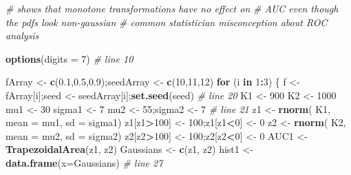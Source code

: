\documentclass[
]{book}
\newenvironment{Shaded}{\begin{snugshade}}{\end{snugshade}}
\newcommand{\CommentTok}[1]{\textcolor[rgb]{0.56,0.35,0.01}{\textit{#1}}}
\newcommand{\ControlFlowTok}[1]{\textcolor[rgb]{0.13,0.29,0.53}{\textbf{#1}}}
\newcommand{\DataTypeTok}[1]{\textcolor[rgb]{0.13,0.29,0.53}{#1}}
\newcommand{\DecValTok}[1]{\textcolor[rgb]{0.00,0.00,0.81}{#1}}
\newcommand{\FloatTok}[1]{\textcolor[rgb]{0.00,0.00,0.81}{#1}}
\newcommand{\KeywordTok}[1]{\textcolor[rgb]{0.13,0.29,0.53}{\textbf{#1}}}
\newcommand{\NormalTok}[1]{#1}
\newcommand{\OperatorTok}[1]{\textcolor[rgb]{0.81,0.36,0.00}{\textbf{#1}}}
\newcommand{\StringTok}[1]{\textcolor[rgb]{0.31,0.60,0.02}{#1}}
\begin{document}
\begin{Shaded}
\begin{Highlighting}[]
\CommentTok{\# shows that monotone transformations have no effect on }
\CommentTok{\# AUC even though the pdfs look non{-}gaussian}
\CommentTok{\# common statistician misconception about ROC analysis}

\KeywordTok{options}\NormalTok{(}\DataTypeTok{digits =} \DecValTok{7}\NormalTok{) }\CommentTok{\# line 10}

\NormalTok{fArray \textless{}{-}}\StringTok{ }\KeywordTok{c}\NormalTok{(}\FloatTok{0.1}\NormalTok{,}\FloatTok{0.5}\NormalTok{,}\FloatTok{0.9}\NormalTok{);seedArray \textless{}{-}}\StringTok{ }\KeywordTok{c}\NormalTok{(}\DecValTok{10}\NormalTok{,}\DecValTok{11}\NormalTok{,}\DecValTok{12}\NormalTok{)}
\ControlFlowTok{for}\NormalTok{ (i }\ControlFlowTok{in} \DecValTok{1}\OperatorTok{:}\DecValTok{3}\NormalTok{) \{ }
\NormalTok{  f \textless{}{-}}\StringTok{ }\NormalTok{fArray[i];seed \textless{}{-}}\StringTok{ }\NormalTok{seedArray[i];}\KeywordTok{set.seed}\NormalTok{(seed) }\CommentTok{\# line 20}
\NormalTok{  K1 \textless{}{-}}\StringTok{ }\DecValTok{900}
\NormalTok{  K2 \textless{}{-}}\StringTok{ }\DecValTok{1000}
\NormalTok{  mu1 \textless{}{-}}\StringTok{ }\DecValTok{30}
\NormalTok{  sigma1 \textless{}{-}}\StringTok{ }\DecValTok{7}
\NormalTok{  mu2 \textless{}{-}}\StringTok{ }\DecValTok{55}\NormalTok{;sigma2 \textless{}{-}}\StringTok{ }\DecValTok{7} \CommentTok{\# line 21}
\NormalTok{  z1 \textless{}{-}}\StringTok{ }\KeywordTok{rnorm}\NormalTok{(}
\NormalTok{    K1, }
    \DataTypeTok{mean =}\NormalTok{ mu1, }
    \DataTypeTok{sd =}\NormalTok{ sigma1)}
\NormalTok{  z1[z1}\OperatorTok{\textgreater{}}\DecValTok{100}\NormalTok{] \textless{}{-}}\StringTok{ }\DecValTok{100}\NormalTok{;z1[z1}\OperatorTok{\textless{}}\DecValTok{0}\NormalTok{] \textless{}{-}}\StringTok{ }\DecValTok{0}
\NormalTok{  z2 \textless{}{-}}\StringTok{ }\KeywordTok{rnorm}\NormalTok{(}
\NormalTok{    K2, }
    \DataTypeTok{mean =}\NormalTok{ mu2, }
    \DataTypeTok{sd =}\NormalTok{ sigma2)}
\NormalTok{  z2[z2}\OperatorTok{\textgreater{}}\DecValTok{100}\NormalTok{] \textless{}{-}}\StringTok{ }\DecValTok{100}\NormalTok{;z2[z2}\OperatorTok{\textless{}}\DecValTok{0}\NormalTok{] \textless{}{-}}\StringTok{ }\DecValTok{0}
\NormalTok{  AUC1 \textless{}{-}}\StringTok{ }\KeywordTok{TrapezoidalArea}\NormalTok{(z1, z2)}
\NormalTok{  Gaussians \textless{}{-}}\StringTok{ }\KeywordTok{c}\NormalTok{(z1, z2)}
\NormalTok{  hist1 \textless{}{-}}\StringTok{ }\KeywordTok{data.frame}\NormalTok{(}\DataTypeTok{x=}\NormalTok{Gaussians) }\CommentTok{\#  line 27}

\end{Highlighting}
\end{Shaded}
\end{document}
